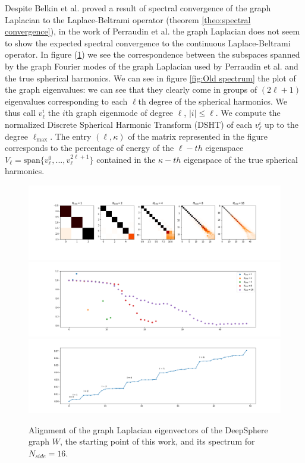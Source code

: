  Despite Belkin et al. proved a result of spectral convergence of the graph Laplacian to the Laplace-Beltrami operator (theorem \ref{theo:spectral convergence}), in the work of Perraudin et al. the graph Laplacian does not seem to show the expected spectral convergence to the continuous Laplace-Beltrami operator. In figure (\ref{fig:Old spectrum1}) we see the correspondence between the subspaces spanned by the graph Fourier modes of the graph Laplacian used by Perraudin et al. and the true spherical harmonics. We can see in figure \ref{fig:Old spectrum} the plot of the graph eigenvalues: we can see that they clearly come in groups of $(2\ell+1)$ eigenvalues corresponding to each $\ell$th degree of the spherical harmonics. We thus call $v_\ell^i$ the $i$th graph eigenmode of degree $\ell$, $|i|\leq\ell$. We compute the normalized Discrete Spherical Harmonic Transform (DSHT) of each $v^i_\ell$ up to the degree $\ell_\text{max}$. The entry $(\ell, \kappa)$ of the matrix represented in the figure corresponds to the percentage of energy of the $\ell-th$ eigenspace $V_\ell = \text{span}\{v^0_\ell, ..., v^{2\ell+1}_\ell\}$ contained in the $\kappa-th$ eigenspace of the true spherical harmonics. 
\begin{figure}[h]
	\begin{center}
		\includegraphics[width=0.9\linewidth]{../codes/02.HeatKernelGraphLaplacian/HEALPix/06_figures/deepsphere_original.png}
		\includegraphics[width=0.9\linewidth]{../codes/02.HeatKernelGraphLaplacian/HEALPix/06_figures/deepsphere_original_diagonal.png}
		\includegraphics[width=0.9\linewidth]{../codes/02.HeatKernelGraphLaplacian/HEALPix/05_figs/old_results3.png}
	\end{center}
	\caption{\label{fig:Old spectrum1}Alignment of the graph Laplacian eigenvectors of the DeepSphere graph $W$, the starting point of this work, and its spectrum for $N_{side}=16$.}
\end{figure} 
